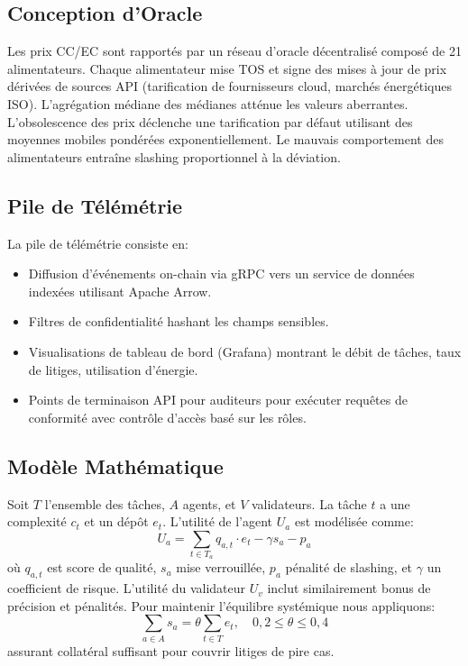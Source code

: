 \documentclass[11pt]{article}
\begin{document}
\subsection{Conception d'Oracle}
Les prix CC/EC sont rapportés par un réseau d'oracle décentralisé composé de 21 alimentateurs. Chaque alimentateur mise TOS et signe des mises à jour de prix dérivées de sources API (tarification de fournisseurs cloud, marchés énergétiques ISO). L'agrégation médiane des médianes atténue les valeurs aberrantes. L'obsolescence des prix déclenche une tarification par défaut utilisant des moyennes mobiles pondérées exponentiellement. Le mauvais comportement des alimentateurs entraîne slashing proportionnel à la déviation.

\subsection{Pile de Télémétrie}
La pile de télémétrie consiste en:
\begin{itemize}[noitemsep]
  \item Diffusion d'événements on-chain via gRPC vers un service de données indexées utilisant Apache Arrow.
  \item Filtres de confidentialité hashant les champs sensibles.
  \item Visualisations de tableau de bord (Grafana) montrant le débit de tâches, taux de litiges, utilisation d'énergie.
  \item Points de terminaison API pour auditeurs pour exécuter requêtes de conformité avec contrôle d'accès basé sur les rôles.
\end{itemize}

\subsection{Modèle Mathématique}
Soit $T$ l'ensemble des tâches, $A$ agents, et $V$ validateurs. La tâche $t$ a une complexité $c_t$ et un dépôt $e_t$. L'utilité de l'agent $U_a$ est modélisée comme:
\begin{equation}
U_a = \sum_{t \in T_a} q_{a,t}\cdot e_t - \gamma s_a - p_a\label{eq:agent-utility}
\end{equation}
où $q_{a,t}$ est score de qualité, $s_a$ mise verrouillée, $p_a$ pénalité de slashing, et $\gamma$ un coefficient de risque. L'utilité du validateur $U_v$ inclut similairement bonus de précision et pénalités. Pour maintenir l'équilibre systémique nous appliquons:
\begin{equation}
\sum_{a \in A} s_a = \theta \sum_{t \in T} e_t,\quad 0,2 \leq \theta \leq 0,4
\end{equation}
assurant collatéral suffisant pour couvrir litiges de pire cas.
\end{document}
